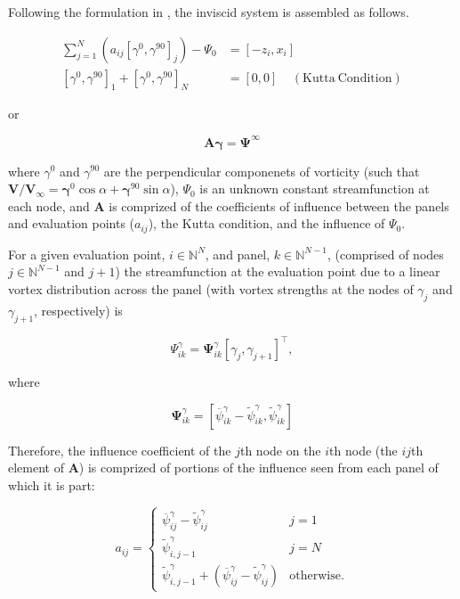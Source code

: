 \documentclass[]{article}
\newcommand{\vect}{\mathbf}
\begin{document}
Following the formulation in \cite{fidkowski_coupled_2022}, the inviscid system is assembled as follows.

\begin{equation}
\begin{aligned}
	\sum_{j=1}^N(a_{ij}[\gamma^0, \gamma^{90}]_j) - \Psi_0 &= [-z_i, x_i] \\
	[\gamma^0, \gamma^{90}]_1 + [\gamma^0, \gamma^{90}]_N &= [0, 0] ~~~~~\mathrm{(Kutta~Condition)}
\end{aligned}
\end{equation}

\noindent or

\begin{equation}
	\mathbf{A} \mathbf{\gamma} = \mathbf{\Psi}^\infty
\end{equation}

\noindent where \(\gamma^0\) and \(\gamma^{90}\) are the perpendicular componenets of vorticity (such that \(\vect{V}/\vect{V}_\infty = \vect{\gamma}^0 \cos\alpha + \vect{\gamma}^{90} \sin\alpha\)), \(\Psi_0\) is an unknown constant streamfunction at each node, and  \(\mathbf{A}\) is comprized of the coefficients of influence between the panels and evaluation points (\(a_{ij}\)), the Kutta condition, and the influence of \(\Psi_0\).

For a given evaluation point, \(i \in \mathbb{N}^N\), and panel, \(k \in \mathbb{N}^{N-1}\), (comprised of nodes \(j \in \mathbb{N}^{N-1}\) and \(j+1\)) the streamfunction at the evaluation point due to a linear vortex distribution across the panel (with vortex strengths at the nodes of \(\gamma_j\) and \(\gamma_{j+1}\), respectively) is

\begin{equation}
	\Psi_{ik}^\gamma = \mathbf{\Psi}^\gamma_{ik} [\gamma_j, \gamma_{j+1}]^\top,
\end{equation}

\noindent where

\begin{equation}
	\mathbf{\Psi}^\gamma_{ik} = \left[\overline{\psi}^\gamma_{ik} - \widetilde{\psi}^\gamma_{ik}, \widetilde{\psi}^\gamma_{ik} \right]
\end{equation}

\noindent Therefore, the influence coefficient of the \(j\)th node on the \(i\)th node (the \(ij\)th element of \(\mathbf{A}\)) is comprized of portions of the influence seen from each panel of which it is part:

\begin{equation}
	a_{ij} = \begin{cases}
		\overline{\psi}^\gamma_{ij} -  \widetilde{\psi}^\gamma_{ij} & j = 1 \\
		\widetilde{\psi}^\gamma_{i,j-1} & j = N \\
		\widetilde{\psi}^\gamma_{i,j-1} + \left(\overline{\psi}^\gamma_{ij} -  \widetilde{\psi}^\gamma_{ij}\right) & \mathrm{otherwise}.
	\end{cases}
\end{equation}
\end{document}
